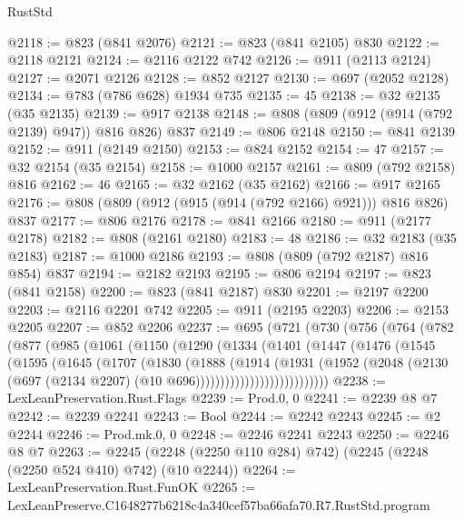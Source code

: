\begin{lexlean}{RustStd}
\begin{coremodule}
@2118 := @823 (@841 @2076)
@2121 := @823 (@841 @2105) @830
@2122 := @2118 @2121
@2124 := @2116 @2122 @742
@2126 := @911 (@2113 @2124)
@2127 := @2071 @2126
@2128 := @852 @2127
@2130 := @697 (@2052 @2128)
@2134 := @783 (@786 @628) @1934 @735
@2135 := 45
@2138 := @32 @2135 (@35 @2135)
@2139 := @917 @2138
@2148 := @808 (@809 (@912 (@914 (@792 @2139) @947)) @816 @826) @837
@2149 := @806 @2148
@2150 := @841 @2139
@2152 := @911 (@2149 @2150)
@2153 := @824 @2152
@2154 := 47
@2157 := @32 @2154 (@35 @2154)
@2158 := @1000 @2157
@2161 := @809 (@792 @2158) @816
@2162 := 46
@2165 := @32 @2162 (@35 @2162)
@2166 := @917 @2165
@2176 := @808 (@809 (@912 (@915 (@914 (@792 @2166) @921))) @816 @826) @837
@2177 := @806 @2176
@2178 := @841 @2166
@2180 := @911 (@2177 @2178)
@2182 := @808 (@2161 @2180)
@2183 := 48
@2186 := @32 @2183 (@35 @2183)
@2187 := @1000 @2186
@2193 := @808 (@809 (@792 @2187) @816 @854) @837
@2194 := @2182 @2193
@2195 := @806 @2194
@2197 := @823 (@841 @2158)
@2200 := @823 (@841 @2187) @830
@2201 := @2197 @2200
@2203 := @2116 @2201 @742
@2205 := @911 (@2195 @2203)
@2206 := @2153 @2205
@2207 := @852 @2206
@2237 := @695
    (@721
      (@730
        (@756
          (@764
            (@782
              (@877
                (@985
                  (@1061
                    (@1150
                      (@1290
                        (@1334
                          (@1401
                            (@1447
                              (@1476
                                (@1545
                                  (@1595
                                    (@1645
                                      (@1707
                                        (@1830
                                          (@1888
                                            (@1914
                                              (@1931
                                                (@1952
                                                  (@2048
                                                    (@2130
                                                      (@697
                                                        (@2134 @2207)
                                                        (@10 @696)))))))))))))))))))))))))))
@2238 := LexLeanPreservation.Rust.Flags
@2239 := Prod.{0, 0}
@2241 := @2239 @8 @7
@2242 := @2239 @2241
@2243 := Bool
@2244 := @2242 @2243
@2245 := @2 @2244
@2246 := Prod.mk.{0, 0}
@2248 := @2246 @2241 @2243
@2250 := @2246 @8 @7
@2263 := @2245 (@2248 (@2250 @110 @284) @742) (@2245 (@2248 (@2250 @524 @410) @742) (@10 @2244))
@2264 := LexLeanPreservation.Rust.FunOK
@2265 := LexLeanPreserve.C1648277b6218c4a340cef57ba66afa70.R7.RustStd.program

\end{coremodule}
\end{lexlean}
